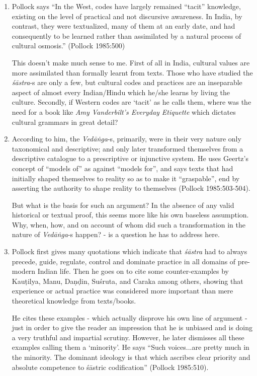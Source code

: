 \begin{enumerate}
\item Pollock says ``In the West, codes have largely remained ``tacit'' knowledge, existing on the level of practical and not discursive awareness. In India, by contrast, they were textualized, many of them at an early date, and had consequently to be learned rather than assimilated by a natural process of cultural osmosis.''  (Pollock 1985:500) 

This doesn't make much sense to me. First of all in India, cultural values are more assimilated than formally learnt from texts. Those who have studied the {\it śāstra}-s are only a few, but cultural codes and practices are an inseparable aspect of almost every Indian/Hindu which he/she learns by living the culture.  Secondly, if Western codes are `tacit' as he calls them, where was the need for a book like \textsl{Amy Vanderbilt's Everyday Etiquette}  which dictates cultural grammars in great detail?

\item According to him, the {\it Vedāṅga}-s,  primarily, were in their very nature only taxonomical and descriptive; and only later transformed themselves from a descriptive catalogue to a prescriptive or injunctive system. He uses Geertz's concept of ``models of'' as against ``models for'', and says texts that had initially shaped themselves to reality so as to make it ``graspable'', end by asserting the authority to shape reality to themselves (Pollock 1985:503-504). 

But what is the basis for such an argument? In the absence of any valid historical or textual proof, this seems more like his own baseless assumption. Why, when, how, and on account of whom did such a transformation in the nature of {\it Vedāṅga}-s happen? - is a question he has to address here.

\item Pollock first gives many quotations which indicate that {\it śāstra} had to always precede, guide, regulate, control and dominate practice in all domains of pre-modern Indian life. Then he goes on to cite some counter-examples by Kauṭilya, Manu, Daṇḍin, Suśruta, and Caraka among others, showing that experience or actual practice was considered more important than mere theoretical knowledge from texts/books. 

He cites these examples - which actually disprove his own line of argument - just in order to give the reader an impression that he is unbiased and is doing a very truthful and impartial scrutiny. However, he later dismisses all these examples calling them a `minority'. He says ``Such voices...are pretty much in the minority. The dominant ideology is that which ascribes clear priority and absolute competence to śāstric codification'' (Pollock 1985:510). 


\end{enumerate}
